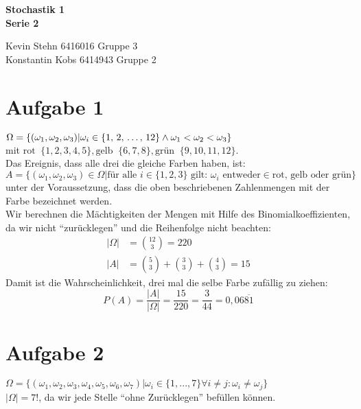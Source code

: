 \documentclass[10pt,a4paper]{article}
\newcommand{\entspricht}{\mathop{\widehat{=}}}
\begin{document}
\begin{center}
\textbf{Stochastik 1 \\ Serie 2 \\}
\end{center}

\begin{flushright}
Kevin Stehn 6416016 Gruppe 3 \\
Konstantin Kobs 6414943 Gruppe 2
\end{flushright}

\section*{Aufgabe 1}
$\Omega = \{(\omega_{1},\omega_{2},\omega_{3}) | \omega_i \in \{ \text{1, 2, \dots, 12}\} \wedge \omega_1 < \omega_2 < \omega_3 \}$\\ mit $\text{rot} \entspricht \{1, 2, 3, 4, 5\}, \text{gelb} \entspricht \{6, 7, 8\}, \text{grün} \entspricht \{9, 10, 11, 12\}$.\\
Das Ereignis, dass alle drei die gleiche Farben haben, ist:\\
$A = \{(\omega_1, \omega_2, \omega_3) \in \Omega | \text{für alle } i \in \{1,2,3\} \text{ gilt: } \omega_i \text{ entweder} \in \text{rot, gelb oder grün} \}$ unter der Voraussetzung, dass die oben beschriebenen Zahlenmengen mit der Farbe bezeichnet werden.\\
Wir berechnen die Mächtigkeiten der Mengen mit Hilfe des Binomialkoeffizienten, da wir nicht ``zurücklegen'' und die Reihenfolge nicht beachten:
\begin{align*}
	|\Omega| &= \binom{12}{3} = 220\\
	|A| &= \binom{5}{3} + \binom{3}{3} +\binom{4}{3} = 15
\end{align*}
Damit ist die Wahrscheinlichkeit, drei mal die selbe Farbe zuf\"allig zu ziehen: \\
$$P(A) = \frac{|A|}{|\Omega|} = \frac{15}{220} = \frac{3}{44} = 0,06\overline{81}$$

\section*{Aufgabe 2}
$\Omega = \{(\omega_{1},\omega_{2},\omega_{3},\omega_{4},\omega_{5},\omega_{6},\omega_{7}) | \omega_{i} \in \{1,...,7\} \forall i \neq j : \omega_{i} \neq \omega_{j}\}$ \\
$|\Omega| = 7!$, da wir jede Stelle ``ohne Zurücklegen'' befüllen können.
\end{document}
